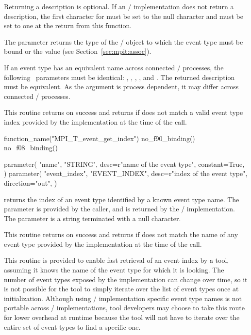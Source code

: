 
 Returning a
description is optional.  If an \mpi/ implementation does not return a
description, the first character for  must be set to the null
character and  must be set to one at the return from this
function.

The parameter  returns the type of the \MPI/ object to which
the event type must be bound or the value 
(see Section~\ref{sec:mpit:assoc}).

If an event type has an equivalent name across connected \MPI/ processes, the
following \OUT\ parameters must be identical: ,
, , ,
and .  The returned description must be equivalent.
As the argument  is process dependent, it
may differ across connected \MPI/ processes.

This routine returns  on success and returns
 if  does not match
a valid event type index provided by the implementation at the time of the
call.

\begin{mpi-binding}
    function_name("MPI_T_event_get_index")
    no_f90_binding()
    no_f08_binding()

    parameter(
        "name",
        "STRING",
        desc=r"name of the event type",
        constant=True,
    )
    parameter(
        "event_index",
        "EVENT_INDEX",
        desc=r"index of the event type",
        direction="out",
    )
\end{mpi-binding}

 returns the index of an event type
identified by a known event type name.  The  parameter is
provided by the caller, and  is returned by the \MPI/
implementation. The  parameter is a string terminated with a
null character.

This routine returns  on success and returns
 if  does not match the name
of any event type provided by the implementation at the time of the call.

\begin{rationale}
This routine is provided to enable fast retrieval of an event index by a 
tool, assuming it knows the name of the event type for which it is looking.
The number of event types exposed by the implementation can change over
time, so it is not possible for the tool to simply iterate over the list of
event types once at initialization.  Although using \MPI/ implementation
specific event type names is not portable across \MPI/ implementations, tool
developers may choose to take this route for lower overhead at runtime
because the tool will not have to iterate over the entire set of event types 
to find a specific one.
\end{rationale}


